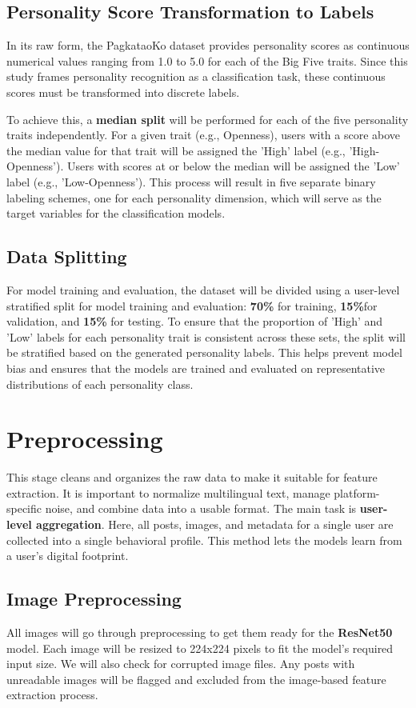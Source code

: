 \subsection{Personality Score Transformation to Labels}
In its raw form, the PagkataoKo dataset provides personality scores as continuous numerical values ranging from 1.0 to 5.0 for each of the Big Five traits. Since this study frames personality recognition as a classification task, these continuous scores must be transformed into discrete labels.

To achieve this, a \textbf{median split} will be performed for each of the five personality traits independently. For a given trait (e.g., Openness), users with a score above the median value for that trait will be assigned the 'High' label (e.g., 'High-Openness'). Users with scores at or below the median will be assigned the 'Low' label (e.g., 'Low-Openness'). This process will result in five separate binary labeling schemes, one for each personality dimension, which will serve as the target variables for the classification models.

\subsection{Data Splitting}
For model training and evaluation, the dataset will be divided using a user-level stratified split for model training and evaluation: \textbf{70\%} for training, \textbf{15\%}for validation, and \textbf{15\%} for testing. To ensure that the proportion of 'High' and 'Low' labels for each personality trait is consistent across these sets, the split will be stratified based on the generated personality labels. This helps prevent model bias and ensures that the models are trained and evaluated on representative distributions of each personality class.

\section{Preprocessing}
This stage cleans and organizes the raw data to make it suitable for feature extraction. It is important to normalize multilingual text, manage platform-specific noise, and combine data into a usable format. The main task is \textbf{user-level aggregation}. Here, all posts, images, and metadata for a single user are collected into a single behavioral profile. This method lets the models learn from a user's digital footprint.

\subsection{Image Preprocessing}
All images will go through preprocessing to get them ready for the \textbf{ResNet50} model. Each image will be resized to 224x224 pixels to fit the model’s required input size. We will also check for corrupted image files. Any posts with unreadable images will be flagged and excluded from the image-based feature extraction process.

